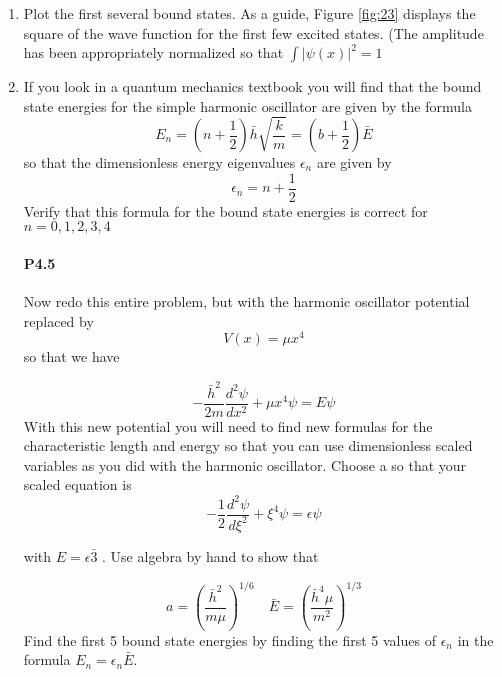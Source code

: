 \begin{enumerate}[label=(\alph*)]
\item Plot the first several bound states. As a guide, Figure \ref{fig:23} displays the square
of the wave function for the first few excited states. (The amplitude has
been appropriately normalized so that $ \int |ψ(x)|^2 = 1$
\item  If you look in a quantum mechanics textbook you will find that the bound
state energies for the simple harmonic oscillator are given by the formula
\begin{equation}\label{eq:416}
E_n = (n + \frac{1}{2}) \bar{h}\sqrt{\frac{k}{m}} =(b+\frac{1}{2})\bar{E}
\end{equation}
so that the dimensionless energy eigenvalues $\epsilon_n$ are given by
\begin{equation}\label{eq:417}
\epsilon_n = n + \frac{1}{2}
\end{equation}
Verify that this formula for the bound state energies is correct for $n =
0,1,2,3,4$
\paragraph*{P4.5}
Now redo this entire problem, but with the harmonic oscillator potential
replaced by
\begin{equation}\label{eq:418}
V(x)=\mu x^4
\end{equation}
so that we have

\begin{equation}\label{eq:419}
-\frac{\bar{h}^{2}}{2 m} \frac{d^{2} \psi}{d x^{2}}+\mu x^{4} \psi=E \psi
\end{equation}
With this new potential you will need to find new formulas for the characteristic length and energy so that you can use dimensionless scaled variables as
you did with the harmonic oscillator. Choose a so that your scaled equation
is
\begin{equation}\label{eq:420}
- \frac{1}{2} \frac{d^{2} \psi}{d \xi^{2}} + \xi^{4} \psi = \epsilon \psi
\end{equation}

with $E = \epsilon \bar{3}$ . Use algebra by hand to show that

\begin{equation}\label{eq:421}
a=\left(\frac{\bar{h}^{2}}{m \mu}\right)^{1 / 6} \quad \bar{E}=\left(\frac{\bar{h}^{4} \mu}{m^{2}}\right)^{1 / 3}
\end{equation}
Find the first 5 bound state energies by finding the first 5 values of $ \epsilon_n $ in the
formula $E_n =  \epsilon_n \bar{E}$.

\end{enumerate}